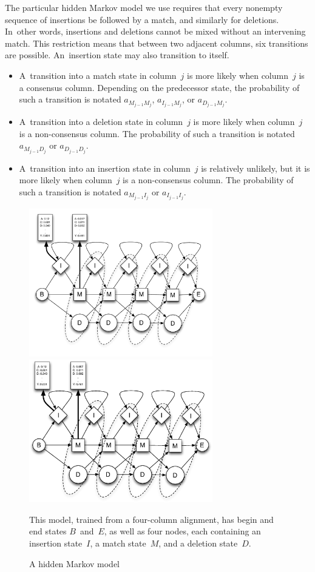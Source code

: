 \documentclass[preprint,nonatbib,blockstyle,nocopyrightspace,times]{sigplanconf}
\newcommand\txprobj[3][]{a#1_{#2_{j-1}#3_j}}
\newcommand\txprobjj[3][]{a#1_{#2_{j-1}#3_j}}
\begin{document}
The particular hidden Markov model we use requires that every nonempty
sequence of insertions be followed by a match, and similarly for
deletions.
In~other words, insertions and deletions cannot be mixed without an
intervening match.
This restriction means that between two adjacent columns, six
transitions are possible.
An~insertion state may also transition to itself.
\begin{itemize} 
\item
A~transition into a match state in
column~$j$ is more likely when column~$j$ is a consensus column.
Depending on the predecessor state, 
the probability of such a transition is notated
$\txprobj M M$, $\txprobj I M$, or $\txprobj D M$.
\item
A~transition into a deletion state in
 column~$j$ is more likely when column~$j$ is a non-consensus column.
The probability of such a transition is notated
$\txprobj M D$ or $\txprobj D D$.
\item
A~transition into an insertion state in
 column~$j$ is relatively unlikely,
but it is more likely when column~$j$ is a non-consensus column.
The probability of such a transition is notated
$\txprobjj M I$ or $\txprobjj I I$.
\end{itemize}



\begin{figure} 
\ifpdfmadness
\centerline{\includegraphics[width=8cm]{Plan7.pdf}} 
\else
\centerline{\includegraphics[width=8cm]{Plan7.eps}} 
\fi

This model, trained from a four-column alignment,
has begin and end states $B$~and~$E$,
as well as four
nodes, each containing 
an insertion state~$I$, 
a match state~$M$, and a
deletion state~$D$.

\caption{A hidden Markov model}

\label{plan7} \end{figure}
\end{document}

